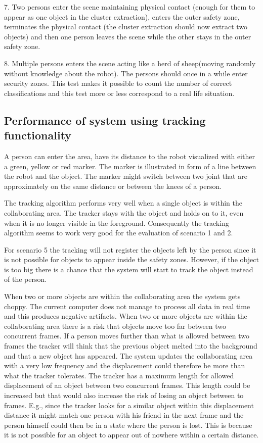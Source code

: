 7. Two persons enter the scene maintaining physical contact (enough for them to appear as one object in the cluster extraction), enters the outer safety zone, terminates the physical contact (the cluster extraction should now extract two objects) and then one person leaves the scene while the other stays in the outer safety zone.

8. Multiple persons enters the scene acting like a herd of sheep(moving randomly without knowledge about the robot). The persons should once in a while enter security zones. This test makes it possible to count the number of correct classifications and this test more or less correspond to a real life situation. 

\subsection{Performance of system using tracking functionality}
A person can enter the area, have its distance to the robot visualized with either a green, yellow or red marker.
The marker is illustrated in form of a line between the robot and the object.
The marker might switch between two joint that are approximately on the same distance or between the knees of a person. 

The tracking algorithm performs very well when a single object is within the collaborating area.
The tracker stays with the object and holds on to it, even when it is no longer visible in the foreground. 
Consequently the tracking algorithm seems to work very good for the evaluation of scenario 1 and 2.

For scenario 5 the tracking will not register the objects left by the person since it is not possible for objects to appear inside the safety zones. However, if the object is too big there is a chance that the system will start to track the object instead of the person. 

When two or more objects are within the collaborating area the system gets choppy.
The current computer does not manage to process all data in real time and this produces negative artifacts.
When two or more objects are within the collaborating area there is a risk that objects move too far between two concurrent frames.
If a person moves further than what is allowed between two frames the tracker will think that the previous object melted into the background and that a new object has appeared.
The system updates the collaborating area with a very low frequency and the displacement could therefore be more than what the tracker tolerates.
The tracker has a maximum length for allowed displacement of an object between two concurrent frames.
This length could be increased but that would also increase the risk of losing an object between to frames.
E.g., since the tracker looks for a similar object within this displacement distance it might match one person with his friend in the next frame and the person himself could then be in a state where the person is lost. 
This is because it is not possible for an object to appear out of nowhere within a certain distance.\\

